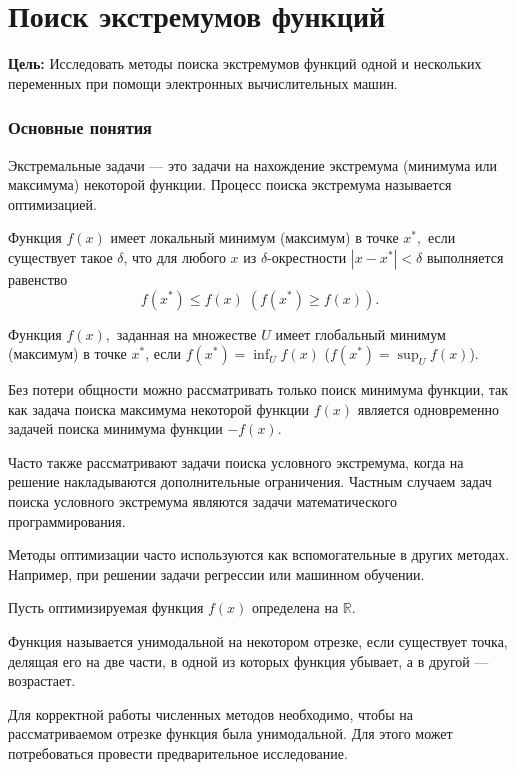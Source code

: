\section{Поиск экстремумов функций}

\noindent \textbf{Цель:} Исследовать методы поиска экстремумов функций
одной и нескольких переменных при помощи электронных вычислительных
машин.

\medskip{}



\subsubsection{Основные понятия}

Экстремальные задачи — это задачи на нахождение экстремума (минимума
или максимума) некоторой функции. Процесс поиска экстремума называется
оптимизацией.
\begin{defn}
Функция $f(x)$ имеет локальный минимум (максимум) в точке $x^{*},$
если существует такое $\delta$, что для любого $x$ из $\delta$-окрестности
$|x-x^{*}|<\delta$ выполняется равенство 
\[
f(x^{*})\leqslant f(x)\;(f(x^{*})\geqslant f(x)).
\]

\end{defn}

\begin{defn}
Функция $f(x),$ заданная на множестве $U$ имеет глобальный минимум
(максимум) в точке $x^{*}$, если $f(x^{*})=\inf_{U}f(x)$ ($f(x^{*})=\sup_{U}f(x)$).
\end{defn}
Без потери общности можно рассматривать только поиск минимума функции,
так как задача поиска максимума некоторой функции $f(x)$ является
одновременно задачей поиска минимума функции $-f(x).$

Часто также рассматривают задачи поиска условного экстремума, когда
на решение накладываются дополнительные ограничения. Частным случаем
задач поиска условного экстремума являются задачи математического
программирования.

Методы оптимизации часто используются как вспомогательные в других
методах. Например, при решении задачи регрессии или машинном обучении. 

Пусть оптимизируемая функция $f(x)$ определена на $\mathbb{R}$.
\begin{defn}
Функция называется унимодальной на некотором отрезке, если существует
точка, делящая его на две части, в одной из которых функция убывает,
а в другой — возрастает.
\end{defn}
Для корректной работы численных методов необходимо, чтобы на рассматриваемом
отрезке функция была унимодальной. Для этого может потребоваться провести
предварительное исследование.


